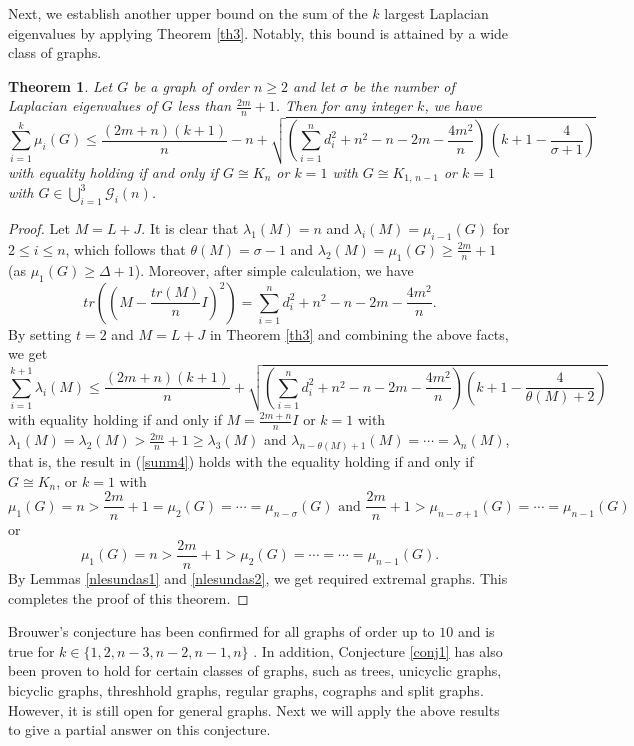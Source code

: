 \documentclass[12pt]{article}
\newtheorem{theorem}{Theorem}[section]
\begin{document}
Next, we establish another upper bound on the sum of the $k$ largest Laplacian eigenvalues by applying Theorem \ref{th3}. Notably, this bound is attained by  a wide class of graphs.
 \begin{theorem} \label{thm32}
    Let $G$ be a graph of order $n\geq 2$ and let $\sigma$ be the number of Laplacian eigenvalues of $G$ less than
    $\frac{2m}{n}+1$. Then for any integer $k$, we have
 \begin{equation}
    \sum_{i=1}^{k}\mu_i(G)\leq\frac{(2m+n)(k+1)}{n}-n+\sqrt
    {\left(\sum_{i=1}^{n}d^2_i+n^2-n-2m-\frac{4m^2}{n}\right)\,\left(k+1-\frac{4}{\sigma+1}\right)} \label{sunm4}
 \end{equation}
 with equality holding if and only if $G\cong K_n$ or $k=1$ with $G\cong K_{1,\,{n-1}}$ or $k=1$ with $G\in \bigcup_{i=1}^3\mathcal{G}_i(n)$.
      \end{theorem}
  \begin{proof}
 Let $M=L+J$. It is clear that $\lambda_1(M)=n$ and
 $\lambda_i(M)=\mu_{i-1}(G)$ for $2\leq i\leq n$, which follows that
 $\theta(M)=\sigma-1$ and $\lambda_2(M)=\mu_{1}(G)\geq \frac{2m}{n}+1$ (as $\mu_{1}(G)\geq \Delta+1$). Moreover, after simple calculation, we have
$$tr\left((M-\frac{tr(M)}{n}I)^2\right)=\sum_{i=1}^{n}d^2_i+n^2-n-2m-\frac{4m^2}{n}.$$
  By setting $t=2$ and $M=L+J$ in Theorem \ref{th3} and combining the above facts, we get
  \begin{equation*}
 \sum_{i=1}^{k+1}\lambda_i(M)\leq \frac{(2m+n)(k+1)}{n}+\sqrt
    {\left(\sum_{i=1}^{n}d^2_i+n^2-n-2m-\frac{4m^2}{n}\right)\left(k+1-\frac
    {4}{\theta(M)+2}\right)}
 \end{equation*}
 with equality holding if and only if $M=\frac{2m+n}{n}I$ or $k=1$
 with $\lambda_1(M)=\lambda_2(M)>\frac{2m}{n}+1\geq\lambda_3(M)$
    and $\lambda_{n-\theta(M)+1}(M)=\cdots=\lambda_{n}(M)$, that is,
 the result in (\ref{sunm4}) holds with
 the equality holding if and only if $G\cong K_n$, or $k=1$ with
$$\mbox{$\mu_1(G)=n>\frac{2m}{n}+1=\mu_2(G)=\cdots=\mu_{n-\sigma}(G)$ and $\frac{2m}{n}+1>\mu_{n-\sigma+1}(G)=\cdots=\mu_{n-1}(G)$}$$
or
$$\mbox{$\mu_1(G)=n>\frac{2m}{n}+1>\mu_2(G)=\cdots=\cdots=\mu_{n-1}(G)$}.$$
 By Lemmas \ref{nlesundas1} and \ref{nlesundas2}, we get required extremal graphs.
 This completes the proof of this theorem.
  \end{proof}

Brouwer's conjecture has been confirmed for all graphs of order up to $10$ and is true for $k\in\{1, 2, n-3, n-2, n-1, n\}$ {\rm \cite{D,F}}.
   In addition, Conjecture \ref{conj1} has also been proven to hold for certain classes of graphs,
   such as trees{\rm \cite{F}}, unicyclic graphs{\rm \cite{G,H}}, bicyclic graphs{\rm \cite{G}},
   threshhold graphs{\rm \cite{F}}, regular graphs{\rm \cite{I}}, cographs{\rm \cite{I}} and split graphs{\rm \cite{I}}.
   However, it is still open for general graphs. Next we will apply the above results to give a partial answer on this conjecture. 
\end{document}
